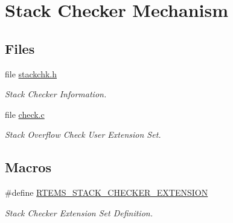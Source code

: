 \hypertarget{group__libmisc__stackchk}{}\section{Stack Checker Mechanism}
\label{group__libmisc__stackchk}
\subsection*{Files}
\begin{DoxyCompactItemize}
\item 
file \mbox{\hyperlink{stackchk_8h}{stackchk.\+h}}
\begin{DoxyCompactList}\small\item\em Stack Checker Information. \end{DoxyCompactList}\item 
file \mbox{\hyperlink{check_8c}{check.\+c}}
\begin{DoxyCompactList}\small\item\em Stack Overflow Check User Extension Set. \end{DoxyCompactList}\end{DoxyCompactItemize}
\subsection*{Macros}
\begin{DoxyCompactItemize}
\item 
\#define \mbox{\hyperlink{group__libmisc__stackchk_gae63f9d087743a5d9e2cc66bec5009e71}{R\+T\+E\+M\+S\+\_\+\+S\+T\+A\+C\+K\+\_\+\+C\+H\+E\+C\+K\+E\+R\+\_\+\+E\+X\+T\+E\+N\+S\+I\+ON}}
\begin{DoxyCompactList}\small\item\em Stack Checker Extension Set Definition. \end{DoxyCompactList}\end{DoxyCompactItemize}
